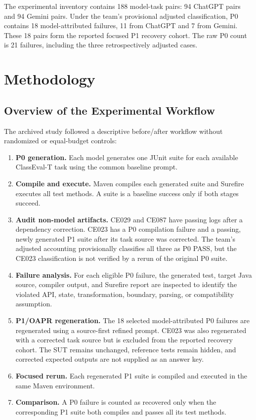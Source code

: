 \documentclass[conference]{IEEEtran}
\begin{document}
The experimental inventory contains 188 model-task pairs: 94 ChatGPT pairs and 94 Gemini pairs. Under the team's provisional adjusted classification, P0 contains 18 model-attributed failures, 11 from ChatGPT and 7 from Gemini. These 18 pairs form the reported focused P1 recovery cohort. The raw P0 count is 21 failures, including the three retrospectively adjusted cases.

\section{Methodology}
\subsection{Overview of the Experimental Workflow}
The archived study followed a descriptive before/after workflow without randomized or equal-budget controls:

\begin{enumerate}[leftmargin=*,nosep]
    \item \textbf{P0 generation.} Each model generates one JUnit suite for each available ClassEval-T task using the common baseline prompt.
    \item \textbf{Compile and execute.} Maven compiles each generated suite and Surefire executes all test methods. A suite is a baseline success only if both stages succeed.
    \item \textbf{Audit non-model artifacts.} CE029 and CE087 have passing logs after a dependency correction. CE023 has a P0 compilation failure and a passing, newly generated P1 suite after its task source was corrected. The team's adjusted accounting provisionally classifies all three as P0 PASS, but the CE023 classification is not verified by a rerun of the original P0 suite.
    \item \textbf{Failure analysis.} For each eligible P0 failure, the generated test, target Java source, compiler output, and Surefire report are inspected to identify the violated API, state, transformation, boundary, parsing, or compatibility assumption.
    \item \textbf{P1/OAPR regeneration.} The 18 selected model-attributed P0 failures are regenerated using a source-first refined prompt. CE023 was also regenerated with a corrected task source but is excluded from the reported recovery cohort. The SUT remains unchanged, reference tests remain hidden, and corrected expected outputs are not supplied as an answer key.
    \item \textbf{Focused rerun.} Each regenerated P1 suite is compiled and executed in the same Maven environment.
    \item \textbf{Comparison.} A P0 failure is counted as recovered only when the corresponding P1 suite both compiles and passes all its test methods.
\end{enumerate}
\end{document}
